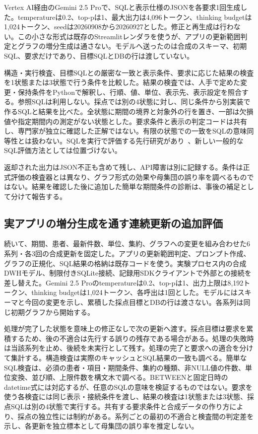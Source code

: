 \documentclass[manuscript,review,anonymous]{acmart}
\begin{document}
Vertex AI経由のGemini 2.5 Proで、SQLと表示仕様のJSONを各要求1回生成した。temperatureは0.2、top-pは1、最大出力は4,096トークン、thinking budgetは1,024トークン、seedは20260908から20260927とした。修正と再生成は行わない。この小さな形式は既存のStreamlitレンダラを使うが、アプリの更新範囲判定とグラフの増分生成は通さない。モデルへ送ったのは合成のスキーマ、初期SQL、要求だけであり、目標SQLとDBの行は渡していない。

構造・実行検査、目標SQLとの厳密な一致と表示条件、要求に応じた結果の検査を1状態または3状態で行う条件を比較した。結果の検査では、人手で定めた変更・保持条件をPythonで解釈し、行順、値、単位、表示先、表示設定を照合する。参照SQLは利用しない。採点では別の4状態に対し、同じ条件から別実装で作るSQLと結果を比べた。全状態に期間の境界と対象外の行を置き、一部は欠損値や指定期間内の測定がない状態とした。要求条件と表示の判定コードは共有し、専門家が独立に確認した正解ではない。有限の状態での一致をSQLの意味同等性とは扱わない。SQLを実行で評価する先行研究があり~\cite{zhong2020semantic}、新しい一般的なSQL評価方法としては位置づけない。

返却された出力はJSON不正も含めて残し、API障害は別に記録する。条件は正式評価の検査器とは異なり、グラフ形式の効果や母集団の誤り率を調べるものではない。結果を確認した後に追加した簡単な期間条件の診断は、事後の補足として分けて報告する。

\subsection{実アプリの増分生成を通す連続更新の追加評価}
\label{sec:sequential-pilot}

続いて、期間、患者、最新件数、単位、集約、グラフへの変更を組み合わせた6系列・各3回の合成更新を固定した。アプリの更新範囲判定、プロンプト作成、グラフの正規化、SQL結果の格納は既存コードを使う。実験プロセス内の合成DWHモデル、制限付きSQLite接続、記録用SDKクライアントで外部との接続を差し替えた。Gemini 2.5 Proのtemperatureは0.2、top-pは1、出力上限は8,192トークン、thinking budgetは1,024トークン、各呼出は1回とした。モデルにはスキーマと今回の変更を示し、累積した採点目標とDBの行は渡さない。各系列は同じ初期グラフから開始する。

処理が完了した状態を意味上の修正なしで次の更新へ渡す。採点目標は要求を累積するため、後の不適合は先行する誤りの残存である場合がある。処理の失敗時は当該系列を止め、後続を未実行として残す。処理の完了と要求への適合を分けて集計する。構造検査は実際のキャッシュとSQL結果の一致も調べる。簡単なSQL検査は、必須の患者・項目・期間条件、集約の種類、非NULL値の件数、単位変換、並び順、上限件数を構文木で調べる。BETWEENと固定日時のdatetime式には対応するが、任意のSQLの意味を検証するものではない。要求を使う各検査には同じ表示・接続条件を渡し、結果の検査は1状態または3状態、採点SQLは別の4状態で実行する。共有する要求条件と合成データの作り方により、採点の独立性には制約がある。系列ごとの最初の不適合と検査間の判定差を示し、各更新を独立標本として母集団の誤り率を推定しない。
\end{document}
